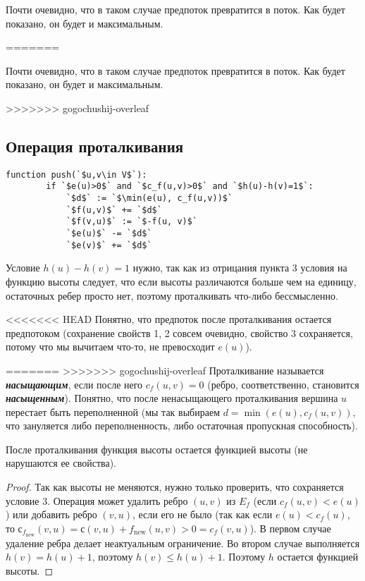 Почти очевидно, что в таком случае предпоток превратится в поток. Как будет показано, он будет и максимальным.
	
=======

Почти очевидно, что в таком случае предпоток превратится в поток. Как будет показано, он будет и максимальным.

>>>>>>> gogochushij-overleaf
\subsection{Операция проталкивания}
\begin{lstlisting}[escapeinside=``]
	function push(`$u,v\in V$`):
		if `$e(u)>0$` and `$c_f(u,v)>0$` and `$h(u)-h(v)=1$`:
			`$d$` := `$\min(e(u), c_f(u,v))$`
			`$f(u,v)$` += `$d$`
			`$f(v,u)$` := `$-f(u, v)$`
			`$e(u)$` -= `$d$`
			`$e(v)$` += `$d$`
\end{lstlisting}
Условие $h(u)-h(v)=1$ нужно, так как из отрицания пункта 3 условия на функцию высоты следует, что если высоты различаются больше чем на единицу, остаточных ребер просто нет, поэтому проталкивать что-либо бессмысленно.

<<<<<<< HEAD
Понятно, что предпоток после проталкивания остается предпотоком (сохранение свойств 1, 2 совсем очевидно, свойство 3 сохраняется, потому что мы вычитаем что-то, не превосходит $e(u)$\label{someshit7}).

=======
>>>>>>> gogochushij-overleaf
Проталкивание называется {\bf\it насыщающим}, если после него $c_f(u,v)=0$ (ребро, соответственно, становится {\bf\it насыщенным}). Понятно, что после ненасыщающего проталкивания вершина $u$ перестает быть переполненной (мы так выбираем $d=\min(e(u), c_f(u,v))$, что зануляется либо переполненность, либо остаточная пропускная способность).

\begin{lemma}
	После проталкивания функция высоты остается функцией высоты (не нарушаются ее свойства).
\end{lemma}
\begin{proof}
	Так как высоты не меняются, нужно только проверить, что сохраняется условие 3. Операция может удалить ребро $(u,v)$ из $E_f$ (если $c_f(u,v)<e(u)$) или добавить ребро $(v,u)$, если его не было (так как если $e(u)<c_f(u)$, то $с_{f_\mathrm{new}}(v,u)=с(v,u)+f_\mathrm{new}(u,v)>0=c_f(v,u)$). В первом случае удаление ребра делает неактуальным ограничение. Во втором случае выполняется $h(v)=h(u)+1$, поэтому $h(v)\le h(u)+1$. Поэтому $h$ остается функцией высоты.
\end{proof}
